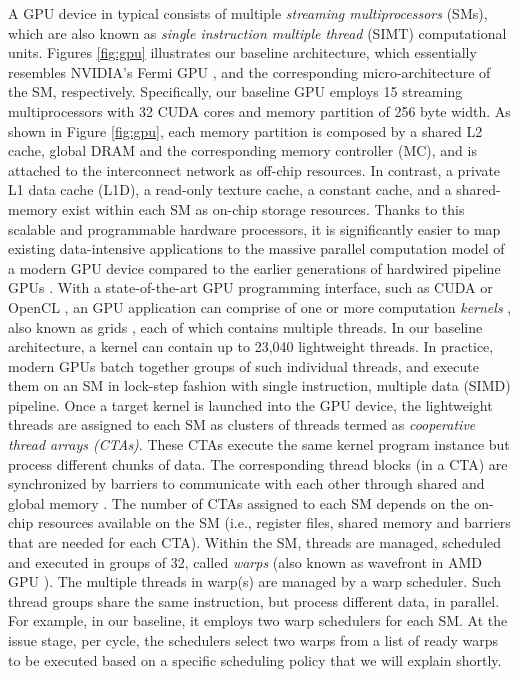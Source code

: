 \documentclass{sigplanconf}
\begin{document}
A GPU device in typical consists of multiple \textit{streaming multiprocessors} (SMs), which are also known as \textit{single instruction multiple thread} (SIMT) computational units. Figures \ref{fig:gpu} illustrates our baseline architecture, which essentially resembles NVIDIA's Fermi GPU \cite{nvidia2009nvidia}, and the corresponding micro-architecture of the SM, respectively. Specifically, our baseline GPU employs 15 streaming multiprocessors with 32 CUDA cores and memory partition of 256 byte width. As shown in Figure \ref{fig:gpu}, each memory partition is composed by a shared L2 cache, global DRAM and the corresponding memory controller (MC), and is attached to the interconnect network as off-chip resources. In contrast, a private L1 data cache (L1D), a read-only texture cache, a constant cache, and a shared-memory exist within each SM as on-chip storage resources. Thanks to this scalable and programmable hardware processors, it is significantly easier to map existing data-intensive applications to the massive parallel computation model of a modern GPU device compared to the earlier generations of hardwired pipeline GPUs \cite{lindholm2008nvidia}.
With a state-of-the-art GPU programming interface, such as CUDA \cite{nvidia2008programming} or OpenCL \cite{munshi2009opencl}, an GPU application can comprise of one or more computation \textit{kernels} \cite{nvidia2008programming}, also known as grids \cite{nvidia2008programming}, each of which contains multiple threads. In our baseline architecture, a kernel can contain up to 23,040 lightweight threads. In practice, modern GPUs batch together groups of such individual threads, and execute them on an SM in lock-step fashion with single instruction, multiple data (SIMD) pipeline. Once a target kernel is launched into the GPU device, the lightweight threads are assigned to each SM as clusters of threads termed as \emph{cooperative thread arrays (CTAs)}. These CTAs execute the same kernel program instance but process different chunks of data. The corresponding thread blocks (in a CTA) are synchronized by barriers to communicate with each other through shared and global memory \cite{lindholm2008nvidia}.
The number of CTAs assigned to each SM depends on the on-chip resources available on the SM (i.e., register files, shared memory and barriers that are needed for each CTA).
Within the SM, threads are managed, scheduled and executed in groups of 32, called \emph{warps} \cite{lindholm2008nvidia} (also known as wavefront in AMD GPU \cite{sdk2010v2}).
The multiple threads in warp(s) are managed by a warp scheduler. Such thread groups share the same instruction, but process different data, in parallel. For example, in our baseline, it employs two warp schedulers for each SM. At the issue stage, per cycle, the schedulers select two warps from a list of ready warps to be executed based on a specific scheduling policy that we will explain shortly.
\end{document}
